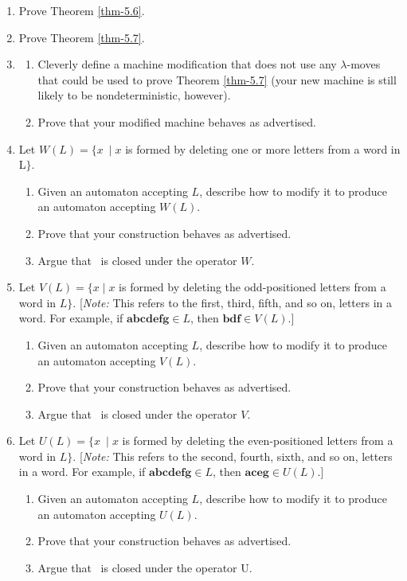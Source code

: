 \begin{enumerate}[{5.}1. ]
\item Prove Theorem \ref{thm-5.6}.

\item Prove Theorem \ref{thm-5.7}.

\item \begin{enumerate}
\item Cleverly define a machine modification that does not use any
$\lambda$-moves that could be used to prove Theorem \ref{thm-5.7} (your new machine is
still likely to be nondeterministic, however).
\item Prove that your modified machine behaves as advertised.
\end{enumerate}

\item Let $W(L)=\{x\  \mid x$ is formed by deleting one or more letters from a word
in L$\}$.
\begin{enumerate}
\item Given an automaton accepting $L$, describe how to modify it to produce an
automaton accepting $W(L)$.
\item Prove that your construction behaves as advertised.
\item Argue that \DSIG\ is closed under the operator $W$.
\end{enumerate}

\item Let $V(L)=\{x  \mid x$ is formed by deleting the odd-positioned letters from a
word in $L\}$. [\emph{Note:} This refers to the first, third, fifth, and so on,
letters in a word. For example, if $\pmb{abcdefg}\in L$, then $\pmb{bdf}\in
V(L)$.]
\begin{enumerate}
\item Given an automaton accepting $L$, describe how to modify it to produce an
automaton accepting $V(L)$.
\item Prove that your construction behaves as advertised.
\item Argue that \DSIG\ is closed under the operator $V$.
\end{enumerate}

\item Let $U(L)=\{x\  \mid x$ is formed by deleting the even-positioned letters from
a word in $L\}$. [\emph{Note:} This refers to the second, fourth, sixth, and so
on, letters in a word. For example, if $\pmb{abcdefg} \in L$, then
$\pmb{aceg} \in U(L)$.]
\begin{enumerate}
\item Given an automaton accepting $L$, describe how to modify it to produce an
automaton accepting $U(L)$.
\item Prove that your construction behaves as advertised.
\item Argue that \DSIG\ is closed under the operator U.
\end{enumerate}


\end{enumerate}
